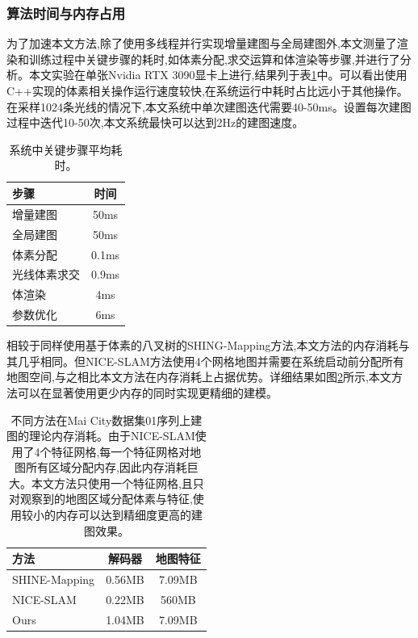 \subsubsection{算法时间与内存占用}
为了加速本文方法,除了使用多线程并行实现增量建图与全局建图外,本文测量了渲染和训练过程中关键步骤的耗时,如体素分配,求交运算和体渲染等步骤,并进行了分析。本文实验在单张Nvidia RTX 3090显卡上进行,结果列于表\ref{times}中。可以看出使用C++实现的体素相关操作运行速度较快,在系统运行中耗时占比远小于其他操作。在采样1024条光线的情况下,本文系统中单次建图迭代需要40-50ms。设置每次建图过程中迭代10-50次,本文系统最快可以达到2Hz的建图速度。
\begin{table}[htbp]
    \centering
    \caption{系统中关键步骤平均耗时。}\label{times}
    \begin{tabular}[htbp]{llc}
        \toprule
        \multicolumn{2}{l}{步骤} & 时间\\
        \midrule
        \multicolumn{2}{l}{增量建图} & 50ms\\
        \multicolumn{2}{l}{全局建图} & 50ms \\
        \midrule
        \multicolumn{2}{l}{体素分配} & 0.1ms \\
        \multicolumn{2}{l}{光线体素求交} & 0.9ms \\
        \multicolumn{2}{l}{体渲染} & 4ms \\
        \multicolumn{2}{l}{参数优化} & 6ms \\
        \bottomrule
    \end{tabular}
\end{table}

相较于同样使用基于体素的八叉树的SHING-Mapping方法,本文方法的内存消耗与其几乎相同。但NICE-SLAM方法使用4个网格地图并需要在系统启动前分配所有地图空间,与之相比本文方法在内存消耗上占据优势。详细结果如图\ref{memory}所示,本文方法可以在显著使用更少内存的同时实现更精细的建模。
\begin{table}[htbp]
    \centering
    \caption{不同方法在Mai City数据集01序列上建图的理论内存消耗。由于NICE-SLAM使用了4个特征网格,每一个特征网格对地图所有区域分配内存,因此内存消耗巨大。本文方法只使用一个特征网格,且只对观察到的地图区域分配体素与特征,使用较小的内存可以达到精细度更高的建图效果。}\label{memory}
    \begin{tabular}[htbp]{llcc}
        \toprule
        \multicolumn{2}{l}{方法} &解码器 & 地图特征\\
        \midrule
        \multicolumn{2}{l}{SHINE-Mapping} & 0.56MB & 7.09MB\\
        \multicolumn{2}{l}{NICE-SLAM} & 0.22MB & 560MB\\
        \midrule
        \multicolumn{2}{l}{Ours} & 1.04MB & 7.09MB\\
        \bottomrule
    \end{tabular}
\end{table}

